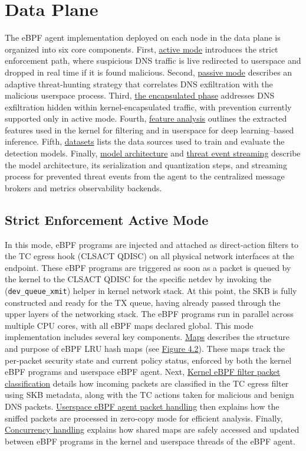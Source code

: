 \documentclass [11pt, proquest] {uwthesis}[2020/02/24]
\begin{document}
\section{Data Plane}
The eBPF agent implementation deployed on each node in the data plane is organized into six core components. First, \hyperref[sec:active]{active mode} introduces the strict enforcement path, where suspicious DNS traffic is live redirected to userspace and dropped in real time if it is found malicious. Second, \hyperref[sec:passive]{passive mode} describes an adaptive threat-hunting strategy that correlates DNS exfiltration with the malicious userspace process. Third, \hyperref[sec:encap]{the encapsulated phase} addresses DNS exfiltration hidden within kernel-encapsulated traffic, with prevention currently supported only in active mode. Fourth, \hyperref[sec:features]{feature analysis} outlines the extracted features used in the kernel for filtering and in userspace for deep learning–based inference. Fifth, \hyperref[sec:dataset]{datasets} lists the data sources used to train and evaluate the detection models. Finally, \hyperref[sec:model]{model architecture} and \hyperref[sec:threat-event-streaming]{threat event streaming} describe the model architecture, its serialization and quantization steps, and streaming process for prevented threat events from the agent to the centralized message brokers and metrics observability backends.

\subsection{Strict Enforcement Active Mode}
\label{sec:active}
In this mode, eBPF programs are injected and attached as direct-action filters to the TC egress hook (CLSACT QDISC) on all physical network interfaces at the endpoint. 
These eBPF programs are triggered as soon as a packet is queued by the kernel to the CLSACT QDISC for the specific netdev by invoking the (\texttt{dev\_queue\_xmit}) helper in kernel network stack. At this point, the SKB is fully constructed and ready for the TX queue, having already passed through the upper layers of the networking stack. The eBPF programs run in parallel across multiple CPU cores, with all eBPF maps declared global.
This mode implementation includes several key components. \hyperref[sec:dp_eBPF_LRU_Maps_active]{Maps} describes the structure and purpose of eBPF LRU hash maps (see \hyperref[sec:dp_eBPF_LRU_Maps_active]{Figure 4.2}). These maps track the per-packet security state and current policy status, enforced by both the kernel eBPF programs and userspace eBPF agent. Next, \hyperref[active:sec1]{Kernel eBPF filter packet classification} details how incoming packets are classified in the TC egress filter using SKB metadata, along with the TC actions taken for malicious and benign DNS packets. \hyperref[active:sec3]{Userspace eBPF agent packet handling} then explains how the sniffed packets are processed in zero-copy mode for efficient analysis. Finally, \hyperref[active:sec3]{Concurrency handling} explains how shared maps are safely accessed and updated between eBPF programs in the kernel and userspace threads of the eBPF agent.
\end{document}
